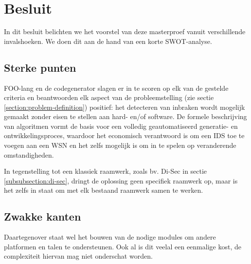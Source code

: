\chapter{Besluit}
\label{besluit}


In dit besluit belichten we het voorstel van deze masterproef vanuit
verschillende invalshoeken. We doen dit aan de hand van een korte SWOT-analyse.

\section{Sterke punten}
\label{section:strenghts}

FOO-lang en de codegenerator slagen er in te scoren op elk van de gestelde
criteria en beantwoorden elk aspect van de probleemstelling (zie sectie
\ref{section:problem-definition}) positief: het detecteren van inbraken wordt
mogelijk gemaakt zonder eisen te stellen aan hard- en/of software. De formele
beschrijving van algoritmen vormt de basis voor een volledig geautomatiseerd
generatie- en ontwikkelingsproces, waardoor het economisch verantwoord is om
een IDS toe te voegen aan een WSN en het zelfs mogelijk is om in te spelen op
veranderende omstandigheden.

In tegenstelling tot een klassiek raamwerk, zoals bv. Di-Sec in sectie
\ref{subsubsection:di-sec}, dringt de oplossing geen specifiek raamwerk op,
maar is het zelfs in staat om met elk bestaand raamwerk samen te werken.

\section{Zwakke kanten}
\label{section:weaknesses}

Daartegenover staat wel het bouwen van de nodige modules om andere platformen
en talen te ondersteunen. Ook al is dit veelal een eenmalige kost, de
complexiteit hiervan mag niet onderschat worden.

